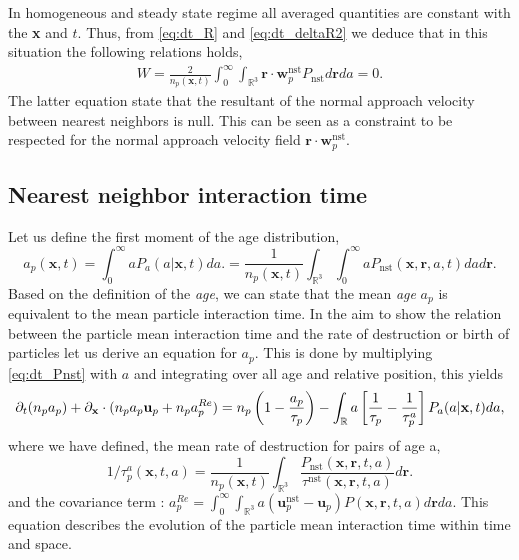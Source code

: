 In homogeneous and steady state regime all averaged quantities are constant with the \textbf{x} and $t$.   
Thus, from \ref{eq:dt_R} and \ref{eq:dt_deltaR2} we deduce that in this situation the following relations holds, 
\begin{align}
    W = \frac{2}{n_p(\textbf{x},t)}
    \int_{0}^\infty
    \int_{\mathbb{R}^3} 
        \textbf{r} \cdot \textbf{w}^\text{nst}_p
    P_\text{nst}
    d\textbf{r}
    da = 0. 
    \label{eq:cdt_for_W}
\end{align}
The latter equation state that the resultant of the normal approach velocity between nearest neighbors is null. 
This can be seen as a constraint to be respected for the normal approach velocity field $\textbf{r}\cdot \textbf{w}_p^\text{nst}$. 



\subsection{Nearest neighbor interaction time}

Let us define the first moment of the age distribution,
\begin{equation}
    a_p(\textbf{x},t) 
    = \int_{0}^{\infty} a P_a(a|\textbf{x},t) da. 
    = \frac{1}{n_p(\textbf{x},t)}
    \int_{\mathbb{R}^3}
    \int_{0}^{\infty} 
    a P_\text{nst}(\textbf{x},\textbf{r},a,t) da d\textbf{r}. 
    \label{eq:a_p}
\end{equation}
Based on the definition of the \textit{age}, we can state that the mean \textit{age} $a_p$ is equivalent to the mean particle interaction time.  
In the aim to show the relation between the particle mean interaction time and the rate of destruction or birth of particles let us derive an equation for $a_p$. 
This is done by multiplying \ref{eq:dt_Pnst} with $a$ and integrating over all age and relative position, this yields
\begin{equation}
    \partial_t (n_p a_p)
    + {\partial_\textbf{x}} \cdot  (n_p a_p \textbf{u}_p + n_p a_p^{Re})
    = 
    n_p\left(1
    - \frac{a_p}{\tau_p}\right)
    - \int_{\mathbb{R}} a \left[
        \frac{1}{\tau_p}
        - \frac{1}{\tau_p^a}
    \right]P_a(a|\textbf{x},t) da,
    \label{eq:dt_a_p}
\end{equation}
where we have defined, the mean rate of destruction for pairs of age a, 
\begin{equation*}
    1/\tau_p^a(\textbf{x},t,a) 
    = \frac{1}{n_p(\textbf{x},t)}\int_{\mathbb{R}^3} \frac{P_\text{nst}(\textbf{x},\textbf{r},t,a)}{\tau^\text{nst}(\textbf{x},\textbf{r},t,a)} d\textbf{r}.
\end{equation*}
and the covariance term : $a^{Re}_p = \int_{0}^\infty\int_{\mathbb{R}^3} a (\textbf{u}^\text{nst}_p - \textbf{u}_p) P(\textbf{x},\textbf{r},t,a) d\textbf{r}da$. 
This equation describes the evolution of the particle mean interaction time within time and space. 

